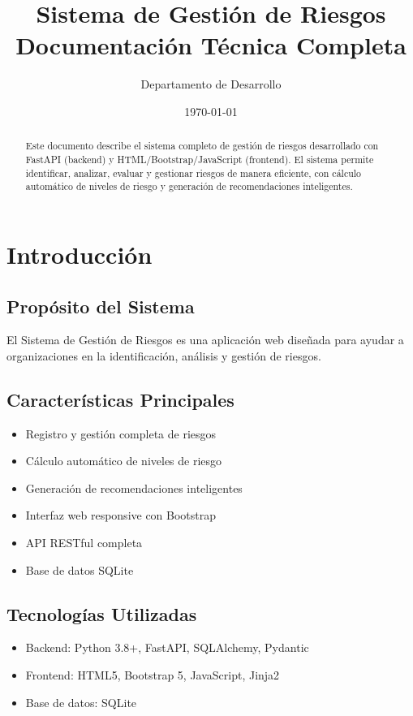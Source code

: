 \documentclass[12pt, a4paper, oneside]{article}
\title{
    \vspace{2cm}
    \textbf{Sistema de Gestión de Riesgos} \\
    \Large Documentación Técnica Completa
    \vspace{1cm}
}
\author{
    Departamento de Desarrollo
}
\date{\today}
\begin{document}
\maketitle
\thispagestyle{empty}

\begin{abstract}
Este documento describe el sistema completo de gestión de riesgos desarrollado con FastAPI (backend) y HTML/Bootstrap/JavaScript (frontend). El sistema permite identificar, analizar, evaluar y gestionar riesgos de manera eficiente, con cálculo automático de niveles de riesgo y generación de recomendaciones inteligentes.
\end{abstract}

\newpage
\tableofcontents
\newpage

\section{Introducción}

\subsection{Propósito del Sistema}
El Sistema de Gestión de Riesgos es una aplicación web diseñada para ayudar a organizaciones en la identificación, análisis y gestión de riesgos.

\subsection{Características Principales}
\begin{itemize}
    \item Registro y gestión completa de riesgos
    \item Cálculo automático de niveles de riesgo
    \item Generación de recomendaciones inteligentes
    \item Interfaz web responsive con Bootstrap
    \item API RESTful completa
    \item Base de datos SQLite
\end{itemize}

\subsection{Tecnologías Utilizadas}
\begin{itemize}
    \item Backend: Python 3.8+, FastAPI, SQLAlchemy, Pydantic
    \item Frontend: HTML5, Bootstrap 5, JavaScript, Jinja2
    \item Base de datos: SQLite
\end{itemize}
\end{document}
